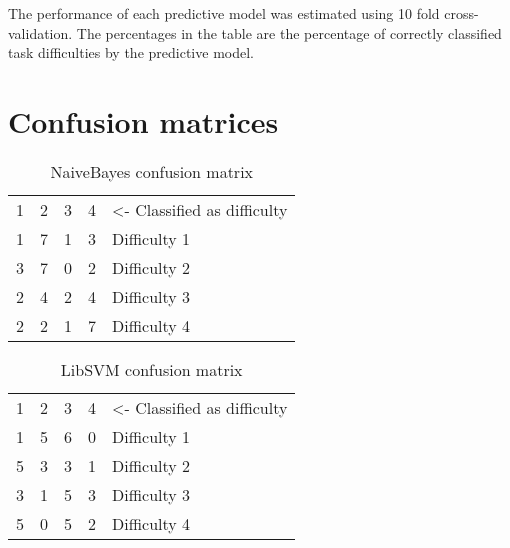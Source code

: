 \documentclass[11pt,leqno,letterpaper]{report} %
\begin{document}
The performance of each predictive model was estimated using 10 fold cross-validation. The percentages in the table are the percentage of correctly classified task difficulties by the predictive model.
\pagebreak

\section{Confusion matrices}

\begin{table}[h]
\caption {NaiveBayes confusion matrix} 
\center
\begin{tabular}{ccccl}
\multicolumn{1}{l}{1} & \multicolumn{1}{l}{2} & \multicolumn{1}{l}{3} & \multicolumn{1}{l}{4} & \small{\textless- Classified as difficulty} \\ \cline{1-4}
1                          & 7                          & 1                          & \multicolumn{1}{c|}{3}     & Difficulty 1                    \\
3                          & 7                          & 0                          & \multicolumn{1}{c|}{2}     & Difficulty 2                    \\
2                          & 4                          & 2                          & \multicolumn{1}{c|}{4}     & Difficulty 3                    \\
2                          & 2                          & 1                          & \multicolumn{1}{c|}{7}     & Difficulty 4                   
\end{tabular}
\end{table}




\begin{table}[h]
\caption {LibSVM confusion matrix} 
\center
\begin{tabular}{ccccl}
\multicolumn{1}{l}{1} & \multicolumn{1}{l}{2} & \multicolumn{1}{l}{3} & \multicolumn{1}{l}{4} & \small{\textless- Classified as difficulty} \\ \cline{1-4}
1                          & 5                          & 6                          & \multicolumn{1}{c|}{0}     & Difficulty 1                    \\
5                          & 3                          & 3                          & \multicolumn{1}{c|}{1}     & Difficulty 2                    \\
3                          & 1                          & 5                          & \multicolumn{1}{c|}{3}     & Difficulty 3                    \\
5                          & 0                          & 5                          & \multicolumn{1}{c|}{2}     & Difficulty 4                   
\end{tabular}
\end{table}
\end{document}
